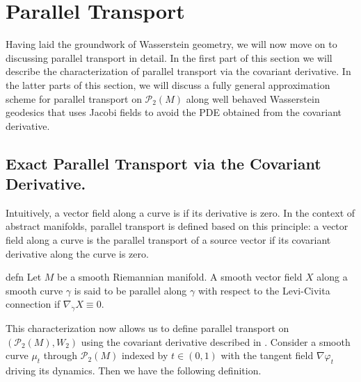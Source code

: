 \documentclass[11pt]{article}
\newcommand{\man}{M}
\begin{document}
\section{Parallel Transport}\label{sec:parallel}

Having laid the groundwork of Wasserstein geometry, we will now move on to discussing parallel transport in detail. In the first part of this section we will describe the characterization of parallel transport via the covariant derivative. In the latter parts of this section, we will discuss a fully general approximation scheme for parallel transport on $\mathcal{P}_2(\man)$ along well behaved Wasserstein geodesics that uses Jacobi fields to avoid the PDE obtained from the covariant derivative.   

\subsection{Exact Parallel Transport via the Covariant Derivative.} 
Intuitively, a vector field along a curve is  if its derivative is zero. In the context of abstract manifolds, parallel transport is defined based on this principle: a vector field along a curve is the parallel transport of a source vector if its covariant derivative along the curve is zero.
\begin{restatable}{defn}{} \label{parallel transport on general manifolds}
    Let $\man$ be a smooth Riemannian manifold. A smooth vector field $X$ along a smooth curve $\gamma$ is said to be parallel along $\gamma$ with respect to the Levi-Civita connection if $\nabla_{\dot \gamma}X \equiv 0$.
\end{restatable}
This characterization now allows us to define parallel transport on $(\mathcal{P}_2(\man), W_2)$ using the covariant derivative described in . Consider a smooth curve $\mu_t$ through $\mathcal{P}_2(\man)$ indexed by $t \in (0, 1)$ with the tangent field $\nabla \varphi_t$ driving its dynamics. Then we have the following definition. 
\end{document}
